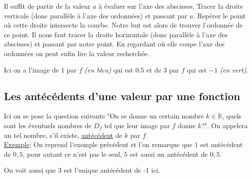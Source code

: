 \documentclass[french]{book}
\begin{document}

Il suffit de partir de la valeur $a$ à évaluer sur l'axe des abscisses. Tracer la droite verticale (donc parallèle à l'axe des ordonnées) et passant par $a$. Repérer le point où cette droite intersecte la courbe. Notre but est alors de trouver l'ordonnée de ce point. Il nous faut tracer la droite horizontale (donc parallèle à l'axe des abscisses) et passant par notre point. En regardant où elle coupe l'axe des ordonnées on peut enfin lire la valeur recherchée.

Ici on a l'image de $1$ par $f$ \textit{(en bleu)} qui est $0.5$ et de $3$ par $f$ qui est $-1$ \textit{(en vert)}.



\subsection{Les antécédents d'une valeur par une fonction}

Ici on se pose la question suivante "On se donne un certain nombre $k \in  \mathbb{R}$, quels sont les éventuels nombres de $D_f$ tel que leur image par $f$ donne $k$?". On appelera un tel nombre, s'il existe, \underline{antécédent} de $k$ par $f$.\\



\underline{Exemple}: On reprend l'exemple précédent et l'on remarque que $1$ est antécédent de $0,5$, pour autant ce n'est pas le seul, $5$ est  aussi un antécédent de $0,5$.

On voit aussi que 3 est l'unique antécédent de -1 ici.
\end{document}
